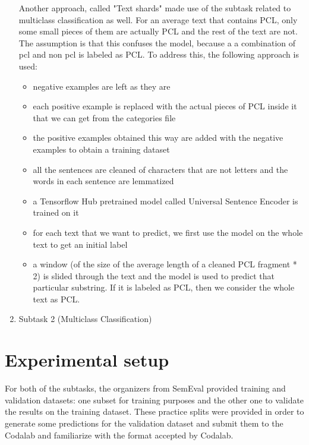 \documentclass[11pt]{article}
\begin{document}
\begin{enumerate}
Another approach, called "Text shards" made use of the subtask related to
multiclass classification as well. For an average text that contains PCL,
only some small pieces of them are actually PCL and the rest of the text are
not. The assumption is that this confuses the model, because a a combination
of pcl and non pcl is labeled as PCL. To address this, the following
approach is used:

\begin{itemize}
\item negative examples are left as they are

\item each positive example is replaced with the actual pieces of PCL inside
it that we can get from the categories file

\item the positive examples obtained this way are added with the negative
examples to obtain a training dataset

\item all the sentences are cleaned of characters that are not letters and
the words in each sentence are lemmatized

\item a Tensorflow Hub pretrained model called Universal Sentence Encoder is
trained on it

\item for each text that we want to predict, we first use the model on the
whole text to get an initial label

\item a window (of the size of the average length of a cleaned PCL fragment
* 2) is slided through the text and the model is used to predict that
particular substring. If it is labeled as PCL, then we consider the whole
text as PCL.
\end{itemize}

\item Subtask 2 (Multiclass Classification)
\end{enumerate}

\section{Experimental setup}

For both of the subtasks, the organizers from SemEval provided training and
validation datasets: one subset for training purposes and the other one to
validate the results on the training dataset. These practice splits were
provided in order to generate some predictions for the validation dataset
and submit them to the Codalab and familiarize with the format accepted by
Codalab.
\end{document}
